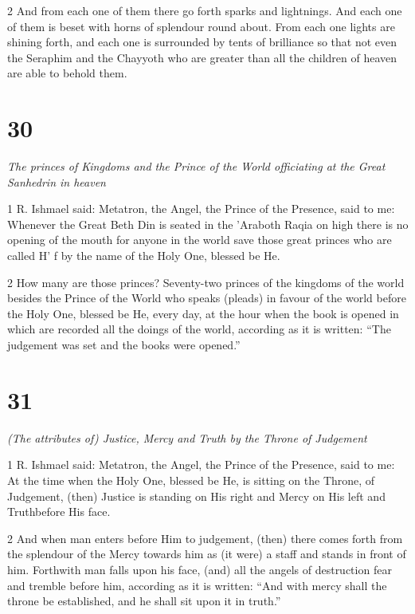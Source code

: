 \par 2 And from each one of them there go forth sparks and lightnings. And each one of them is beset with horns of splendour round about. From each one lights are shining forth, and each one is surrounded by tents of brilliance so that not even the Seraphim and the Chayyoth who are greater than all the children of heaven are able to behold them. 

\chapter{30}

\par \textit{The princes of Kingdoms and the Prince of the World officiating at the Great Sanhedrin in heaven}

\par 1 R. Ishmael said: Metatron, the Angel, the Prince of the Presence, said to me: Whenever the Great Beth Din is seated in the 'Araboth Raqia on high there is no opening of the mouth for anyone in the world save those great princes who are called H' f by the name of the Holy One, blessed be He. 

\par 2 How many are those princes? Seventy-two princes of the kingdoms of the world besides the Prince of the World who speaks (pleads) in favour of the world before the Holy One, blessed be He, every day, at the hour when the book is opened in which are recorded all the doings of the world, according as it is written: “The judgement was set and the books were opened.”

\chapter{31}

\par \textit{(The attributes of) Justice, Mercy and Truth by the Throne of Judgement}

\par 1 R. Ishmael said: Metatron, the Angel, the Prince of the Presence, said to me: At the time when the Holy One, blessed be He, is sitting on the Throne, of Judgement, (then) Justice is standing on His right and Mercy on His left and Truthbefore His face. 

\par 2 And when man enters before Him to judgement, (then) there comes forth from the splendour of the Mercy towards him as (it were) a staff and stands in front of him. Forthwith man falls upon his face, (and) all the angels of destruction fear and tremble before him, according as it is written: “And with mercy shall the throne be established, and he shall sit upon it in truth.” 

